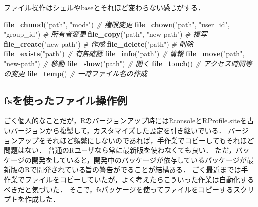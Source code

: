 \documentclass[
]{article}
\newenvironment{Shaded}{\begin{snugshade}}{\end{snugshade}}
\newcommand{\CommentTok}[1]{\textcolor[rgb]{0.56,0.35,0.01}{\textit{#1}}}
\newcommand{\FunctionTok}[1]{\textcolor[rgb]{0.13,0.29,0.53}{\textbf{#1}}}
\newcommand{\NormalTok}[1]{#1}
\newcommand{\StringTok}[1]{\textcolor[rgb]{0.31,0.60,0.02}{#1}}
\begin{document}
ファイル操作はシェルやbaseとそれほど変わらない感じがする．

\begin{Shaded}
\begin{Highlighting}[]
\FunctionTok{file\_chmod}\NormalTok{(}\StringTok{"path"}\NormalTok{, }\StringTok{"mode"}\NormalTok{)                }\CommentTok{\# 権限変更   }
\FunctionTok{file\_chown}\NormalTok{(}\StringTok{"path"}\NormalTok{, }\StringTok{"user\_id"}\NormalTok{, }\StringTok{"group\_id"}\NormalTok{) }\CommentTok{\# 所有者変更   }
\FunctionTok{file\_copy}\NormalTok{(}\StringTok{"path"}\NormalTok{, }\StringTok{"new{-}path"}\NormalTok{)             }\CommentTok{\# 複写   }
\FunctionTok{file\_create}\NormalTok{(}\StringTok{"new{-}path"}\NormalTok{)                   }\CommentTok{\# 作成   }
\FunctionTok{file\_delete}\NormalTok{(}\StringTok{"path"}\NormalTok{)                       }\CommentTok{\# 削除   }
\FunctionTok{file\_exists}\NormalTok{(}\StringTok{"path"}\NormalTok{)                       }\CommentTok{\# 有無確認   }
\FunctionTok{file\_info}\NormalTok{(}\StringTok{"path"}\NormalTok{)                         }\CommentTok{\# 情報   }
\FunctionTok{file\_move}\NormalTok{(}\StringTok{"path"}\NormalTok{, }\StringTok{"new{-}path"}\NormalTok{)             }\CommentTok{\# 移動   }
\FunctionTok{file\_show}\NormalTok{(}\StringTok{"path"}\NormalTok{)                         }\CommentTok{\# 開く   }
\FunctionTok{file\_touch}\NormalTok{()                              }\CommentTok{\# アクセス時間等の変更   }
\FunctionTok{file\_temp}\NormalTok{()                               }\CommentTok{\# 一時ファイル名の作成   }
\end{Highlighting}
\end{Shaded}

\hypertarget{fsux3092ux4f7fux3063ux305fux30d5ux30a1ux30a4ux30ebux64cdux4f5cux4f8b}{%
\subsection{fsを使ったファイル操作例}\label{fsux3092ux4f7fux3063ux305fux30d5ux30a1ux30a4ux30ebux64cdux4f5cux4f8b}}

ごく個人的なことだが，Rのバージョンアップ時にはRconsoleとRProfile.siteを古いバージョンから複製して，カスタマイズした設定を引き継いでいる．
バージョンアップをそれほど頻繁にしないのであれば，手作業でコピーしてもそれほど問題はない．
普通のRユーザなら常に最新版を使わなくても良い．
ただ，パッケージの開発をしていると，開発中のパッケージが依存しているパッケージが最新版のRで開発されている旨の警告がでることが結構ある．
ごく最近までは手作業でファイルをコピーしていたが，よく考えたらこういった作業は自動化するべきだと気づいた．
そこで，fsパッケージを使ってファイルをコピーするスクリプトを作成した．
\end{document}
